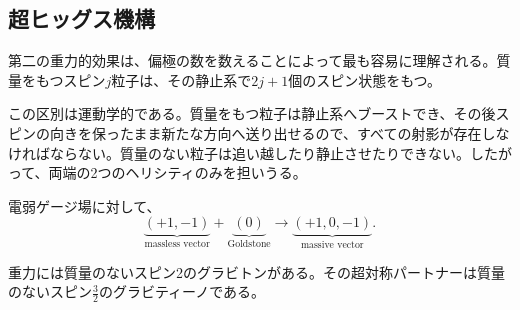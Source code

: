
\subsection{超ヒッグス機構}

第二の重力的効果は、偏極の数を数えることによって最も容易に理解される。質量をもつスピン\(j\)粒子は、その静止系で\(2j+1\)個のスピン状態をもつ。

\begin{classroomqa}
\end{classroomqa}

この区別は運動学的である。質量をもつ粒子は静止系へブーストでき、その後スピンの向きを保ったまま新たな方向へ送り出せるので、すべての射影が存在しなければならない。質量のない粒子は追い越したり静止させたりできない。したがって、両端の2つのヘリシティのみを担いうる。

電弱ゲージ場に対して、
\begin{equation}
\underbrace{(+1,-1)}_{\text{massless vector}}
+
\underbrace{(0)}_{\text{Goldstone}}
\longrightarrow
\underbrace{(+1,0,-1)}_{\text{massive vector}}.
\label{eq:l9-higgs-count}
\end{equation}

\begin{classroomqa}
\end{classroomqa}

重力には質量のないスピン2のグラビトンがある。その超対称パートナーは質量のないスピン\(\tfrac32\)のグラビティーノである。

\begin{classroomqa}
\end{classroomqa}

